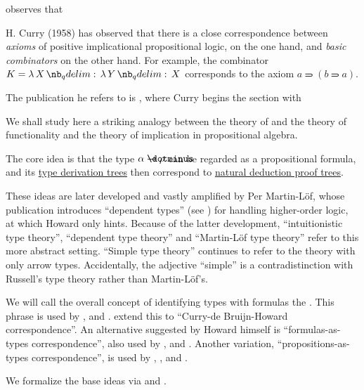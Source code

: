 \begin{concept}\label{con:curry_howard_correspondence}
   observes that
  \begin{displayquote}
    H. Curry (1958) has observed that there is a close correspondence between \textit{axioms} of positive implicational propositional logic, on the one hand, and \textit{basic combinators} on the other hand. For example, the combinator \( K = \qabs X \qabs Y X \) corresponds to the axiom \( a \rightimply (b \rightimply a) \).
  \end{displayquote}

  The publication he refers to is \cite[312]{CurryFeys1958CombinatoryLogic}, where Curry begins the section with
  \begin{displayquote}
    We shall study here a striking analogy between the theory of and the theory of functionality and the theory of implication in propositional algebra.
  \end{displayquote}

  The core idea is that the type \( \alpha \synimplies \rho \) can be regarded as a propositional formula, and its \hyperref[def:type_derivation_tree_tree]{type derivation trees} then correspond to \hyperref[def:natural_deduction_proof_tree]{natural deduction proof trees}.

  These ideas are later developed and vastly amplified by Per Martin-L\"of, whose publication \cite{MartinLöf1975IntTypeTheory} introduces \enquote{dependent types} (see ) for handling higher-order logic, at which Howard only hints. Because of the latter development, \enquote{intuitionistic type theory}, \enquote{dependent type theory} and \enquote{Martin-L\"of type theory} refer to this more abstract setting. \enquote{Simple type theory} continues to refer to the theory with only arrow types. Accidentally, the adjective \enquote{simple} is a contradistinction with Russell's type theory rather than Martin-L\"of's.

  We will call the overall concept of identifying types with formulas the . This phrase is used by ,  and .  extend this to \enquote{Curry-de Bruijn-Howard correspondence}. An alternative suggested by Howard himself is \enquote{formulas-as-types correspondence}, also used by ,  and . Another variation, \enquote{propositions-as-types correspondence}, is used by , ,  and .

  We formalize the base ideas via  and .
\end{concept}
